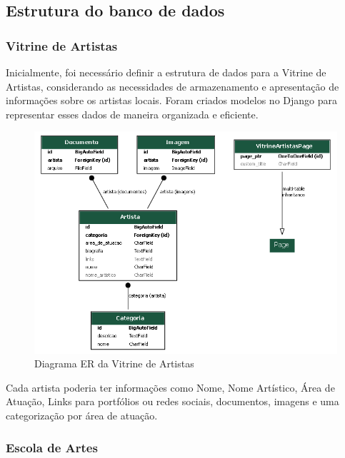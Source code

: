 \subsection{Estrutura do banco de dados}

\subsubsection{Vitrine de Artistas}

Inicialmente, foi necessário definir a estrutura de dados para a Vitrine de Artistas, considerando as necessidades de armazenamento e apresentação de informações sobre os artistas locais. Foram criados modelos no Django para representar esses dados de maneira organizada e eficiente. 

\begin{figure}[htb]
	\caption{\label{fig_grafico}Diagrama ER da Vitrine de Artistas}
	\begin{center}
	    \includegraphics[scale=0.3]{./img/er_diagram_vitrine.png}
	\end{center}
\end{figure}

Cada artista poderia ter informações como Nome, Nome Artístico, Área de Atuação, Links para portfólios ou redes sociais, documentos, imagens e uma categorização por área de atuação.



\subsubsection{Escola de Artes}

